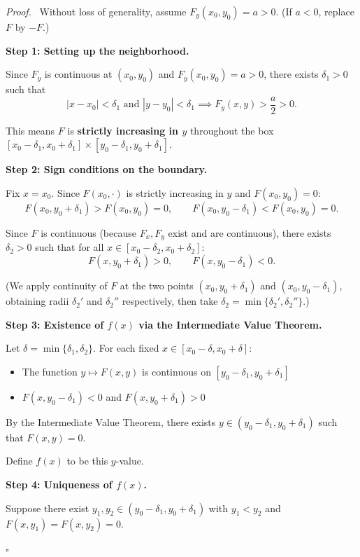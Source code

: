 \documentclass[11pt]{report}
\renewenvironment{proof}[1][Proof]{\par\noindent\textit{#1.}\ }{\hfill$\square$\par\medskip}
\begin{document}
\begin{proof}
Without loss of generality, assume $F_y(x_0, y_0) = a > 0$. (If $a < 0$, replace $F$ by $-F$.)

\textbf{Step 1: Setting up the neighborhood.}

Since $F_y$ is continuous at $(x_0, y_0)$ and $F_y(x_0, y_0) = a > 0$, there exists $\delta_1 > 0$ such that
\[
|x - x_0| < \delta_1 \text{ and } |y - y_0| < \delta_1 \implies F_y(x, y) > \frac{a}{2} > 0.
\]

This means $F$ is \textbf{strictly increasing in $y$} throughout the box $[x_0 - \delta_1, x_0 + \delta_1] \times [y_0 - \delta_1, y_0 + \delta_1]$.

\textbf{Step 2: Sign conditions on the boundary.}

Fix $x = x_0$. Since $F(x_0, \cdot)$ is strictly increasing in $y$ and $F(x_0, y_0) = 0$:
\[
F(x_0, y_0 + \delta_1) > F(x_0, y_0) = 0, \qquad F(x_0, y_0 - \delta_1) < F(x_0, y_0) = 0.
\]

Since $F$ is continuous (because $F_x, F_y$ exist and are continuous), there exists $\delta_2 > 0$ such that for all $x \in [x_0 - \delta_2, x_0 + \delta_2]$:
\[
F(x, y_0 + \delta_1) > 0, \qquad F(x, y_0 - \delta_1) < 0.
\]

(We apply continuity of $F$ at the two points $(x_0, y_0 + \delta_1)$ and $(x_0, y_0 - \delta_1)$, obtaining radii $\delta_2'$ and $\delta_2''$ respectively, then take $\delta_2 = \min\{\delta_2', \delta_2''\}$.)

\textbf{Step 3: Existence of $f(x)$ via the Intermediate Value Theorem.}

Let $\delta = \min\{\delta_1, \delta_2\}$. For each fixed $x \in [x_0 - \delta, x_0 + \delta]$:
\begin{itemize}[itemsep=2pt]
    \item The function $y \mapsto F(x, y)$ is continuous on $[y_0 - \delta_1, y_0 + \delta_1]$
    \item $F(x, y_0 - \delta_1) < 0$ and $F(x, y_0 + \delta_1) > 0$
\end{itemize}

By the Intermediate Value Theorem, there exists $y \in (y_0 - \delta_1, y_0 + \delta_1)$ such that $F(x, y) = 0$.

Define $f(x)$ to be this $y$-value.

\textbf{Step 4: Uniqueness of $f(x)$.}

Suppose there exist $y_1, y_2 \in (y_0 - \delta_1, y_0 + \delta_1)$ with $y_1 < y_2$ and $F(x, y_1) = F(x, y_2) = 0$.


\end{proof}
\end{document}
